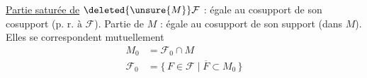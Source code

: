 \uline{Partie saturée  de} $\deleted{\unsure{M}}\mathcal F$ : égale au cosupport de son cosupport ($\text{p. r. à }\mathcal F$). Partie   de $M$ : égale au cosupport de son support (dans $M$). Elles se correspondent mutuellement 
\[
\begin{aligned}
M_0&=\mathcal F_0\cap M\\
\mathcal F_0&=\{\,F\in\mathcal F\mid\overline F\subset M_0\,\}
\end{aligned}
\]
